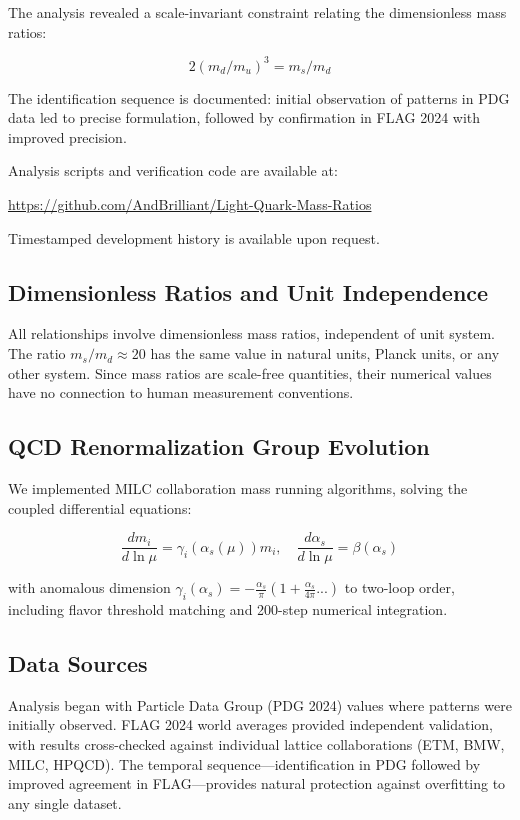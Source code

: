 \documentclass[12pt]{article}
\begin{document}
The analysis revealed a scale-invariant constraint relating the dimensionless mass ratios:

\begin{equation}
2(m_d/m_u)^3 = m_s/m_d
\end{equation}

The identification sequence is documented: initial observation of patterns in PDG data led to precise formulation, followed by confirmation in FLAG 2024 with improved precision.

Analysis scripts and verification code are available at:

\url{https://github.com/AndBrilliant/Light-Quark-Mass-Ratios}

Timestamped development history is available upon request.

\subsection{Dimensionless Ratios and Unit Independence}

All relationships involve dimensionless mass ratios, independent of unit system. The ratio $m_s/m_d \approx 20$ has the same value in natural units, Planck units, or any other system. Since mass ratios are scale-free quantities, their numerical values have no connection to human measurement conventions.

\subsection{QCD Renormalization Group Evolution}

We implemented MILC collaboration mass running algorithms, solving the coupled differential equations:

\begin{equation}
\frac{dm_i}{d\ln\mu} = \gamma_i(\alpha_s(\mu))m_i,\quad \frac{d\alpha_s}{d\ln\mu} = \beta(\alpha_s)
\end{equation}

with anomalous dimension $\gamma_i(\alpha_s) = -\frac{\alpha_s}{\pi}\left(1 + \frac{\alpha_s}{4\pi}...\right)$ to two-loop order, including flavor threshold matching and 200-step numerical integration.

\subsection{Data Sources}

Analysis began with Particle Data Group (PDG 2024) values where patterns were initially observed. FLAG 2024 world averages provided independent validation, with results cross-checked against individual lattice collaborations (ETM, BMW, MILC, HPQCD). The temporal sequence—identification in PDG followed by improved agreement in FLAG—provides natural protection against overfitting to any single dataset.
\end{document}
